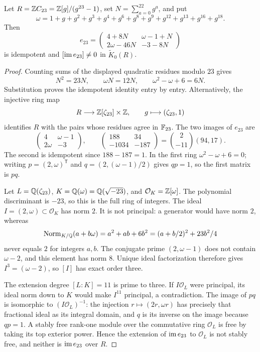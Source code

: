 \begin{proposition}\label{D:C23-projector}
Let $R=\mathbb Z C_{23}=\mathbb Z[g]/(g^{23}-1)$, set $N=\sum_{a=0}^{22}g^a$, and put
\[
 \omega=1+g+g^2+g^3+g^4+g^6+g^8+g^9+g^{12}+g^{13}+g^{16}+g^{18}.
\]
Then
\[
 e_{23}=\begin{pmatrix}
 4+8N&\omega-1+N\\
 2\omega-46N&-3-8N
 \end{pmatrix}
\]
is idempotent and $[\operatorname{im} e_{23}]\ne0$ in $\widetilde K_0(R)$.
\end{proposition}
\begin{proof}
Counting sums of the displayed quadratic residues modulo $23$ gives
\[
 N^2=23N,\qquad \omega N=12N,\qquad
 \omega^2-\omega+6=6N.
\]
Substitution proves the idempotent identity entry by entry. Alternatively,
the injective ring map
\[
 R\longrightarrow \mathbb Z[\zeta_{23}]\times\mathbb Z,
 \qquad g\longmapsto(\zeta_{23},1)
\]
identifies $R$ with the pairs whose residues agree in $\mathbb F_{23}$.
The two images of $e_{23}$ are
\[
 \begin{pmatrix}4&\omega-1\\2\omega&-3\end{pmatrix},
 \qquad
 \begin{pmatrix}188&34\\-1034&-187\end{pmatrix}
   =\binom{2}{-11}(94,17).
\]
The second is idempotent since $188-187=1$. In the first ring
$\omega^2-\omega+6=0$; writing
$p=(2,\omega)^{\mathsf T}$ and $q=(2,(\omega-1)/2)$ gives $qp=1$,
so the first matrix is $pq$.

Let $L=\mathbb Q(\zeta_{23})$, $K=\mathbb Q(\omega)=\mathbb Q(\sqrt{-23})$, and
$\mathcal O_K=\mathbb Z[\omega]$. The polynomial discriminant is $-23$,
so this is the full ring of integers. The ideal
$I=(2,\omega)\subset\mathcal O_K$ has norm $2$.
It is not principal: a generator would have norm $2$, whereas
\[
 \operatorname{Norm}_{K/\mathbb Q}(a+b\omega)
 =a^2+ab+6b^2=(a+b/2)^2+23b^2/4
\]
never equals $2$ for integers $a,b$. The conjugate prime
$(2,\omega-1)$ does not contain $\omega-2$, and this element has
norm $8$. Unique ideal factorization therefore gives
$I^3=(\omega-2)$, so $[I]$ has exact order three.

The extension degree $[L:K]=11$ is prime to three. If
$I\mathcal O_L$ were principal, its ideal norm down to $K$ would
make $I^{11}$ principal, a contradiction. The image of $pq$ is
isomorphic to $(I\mathcal O_L)^{-1}$: the injection
$r\mapsto(2r,\omega r)$ has precisely that fractional ideal as its
integral domain, and $q$ is its inverse on the image because $qp=1$.
A stably free rank-one module over the commutative ring
$\mathcal O_L$ is free by taking its top exterior power. Hence the
extension of $\operatorname{im} e_{23}$ to $\mathcal O_L$ is not stably free,
and neither is $\operatorname{im} e_{23}$ over $R$.
\end{proof}

